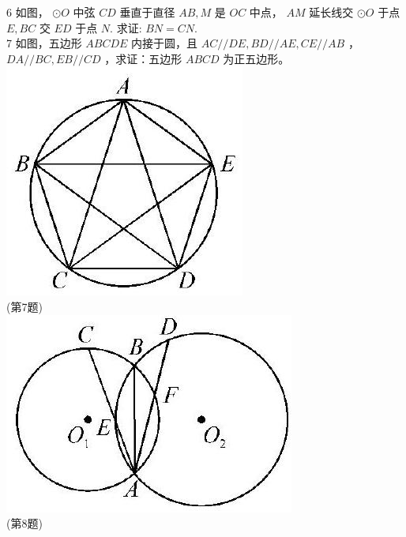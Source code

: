 \documentclass[10pt]{article}
\begin{document}
6 如图， $\odot O$ 中弦 $C D$ 垂直于直径 $A B, M$ 是 $O C$ 中点， $A M$ 延长线交 $\odot O$ 于点 $E, B C$ 交 $E D$ 于点 $N$. 求证: $B N=C N$.\\
7 如图，五边形 $A B C D E$ 内接于圆，且 $A C / / D E, B D / / A E, C E / / A B$ ， $D A / / B C, E B / / C D$ ，求证：五边形 $A B C D$ 为正五边形。\\
\includegraphics[max width=\textwidth, center]{2024_10_30_66b8e5e701da2093c133g-027(5)}\\
(第7题)\\
\includegraphics[max width=\textwidth, center]{2024_10_30_66b8e5e701da2093c133g-027(3)}\\
(第8题)
\end{document}
